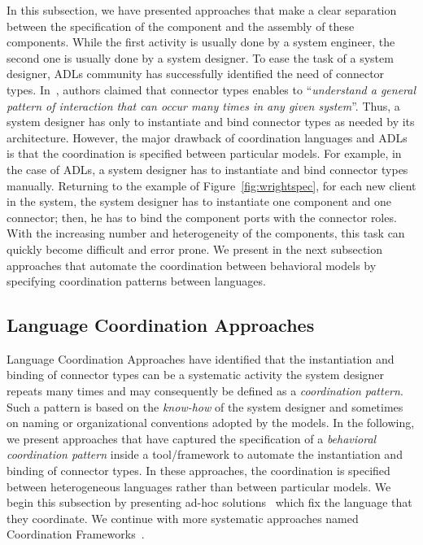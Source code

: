In this subsection, we have presented approaches that make a clear separation between the specification of the component and the assembly of these components. While the first activity is usually done by a system engineer, the second one is usually done by a system designer. To ease the task of a system designer, ADLs community has successfully identified the need of connector types. In~\cite{wrightbib}, authors claimed that connector types enables to ``\emph{understand a general pattern of interaction that can occur many times in any given system}''. Thus, a system designer has only to instantiate and bind connector types as needed by its architecture. However, the major drawback of coordination languages and ADLs is that the coordination is specified between particular models. For example, in the case of ADLs, a system designer has to instantiate and bind connector types manually. Returning to the example of Figure~\ref{fig:wrightspec}, for each new client in the system, the system designer has to instantiate one component and one connector; then, he has to bind the component ports with the connector roles. With the increasing number and heterogeneity of the components, this task can quickly become difficult and error prone. We present in the next subsection approaches that automate the coordination between behavioral models by specifying coordination patterns between languages.

\subsection{Language Coordination Approaches}
Language Coordination Approaches have identified that the instantiation and binding of connector types can be a systematic activity the system designer repeats many times and may consequently be defined as a \emph{coordination pattern}. Such a pattern is based on the \emph{know-how} of the system designer and sometimes on naming or organizational conventions adopted by the models. In the following, we present approaches that have captured the specification of a \emph{behavioral coordination pattern} inside a tool/framework to automate the instantiation and binding of connector types. In these approaches, the coordination is specified between heterogeneous languages rather than between particular models. We begin this subsection by presenting ad-hoc solutions~\cite{mascotbib, dinatale} which fix the language that they coordinate. We continue with more systematic approaches named Coordination Frameworks~\cite{modhelxbib,ptoleframebib}.



